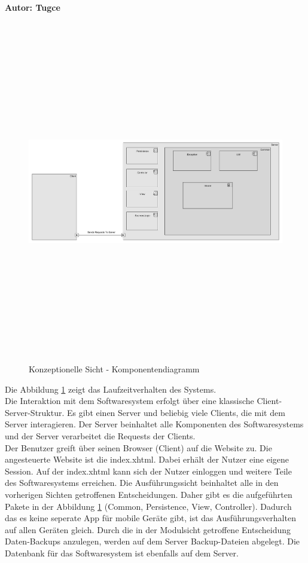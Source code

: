 \textbf{Autor: Tugce}\\
\begin{figure}[ht]
	\centering
  \includegraphics[width=\textwidth,height=15cm,keepaspectratio]{../UMLDiagramme/A-Sicht}
	\caption{Konzeptionelle Sicht - Komponentendiagramm}
	\label{fig15}
\end{figure}
Die Abbildung \ref{fig15} zeigt das Laufzeitverhalten des Systems.\\
Die Interaktion mit dem Softwaresystem erfolgt über eine klassische Client-Server-Struktur.  Es gibt einen Server und beliebig viele Clients, die mit dem Server interagieren. Der Server beinhaltet alle Komponenten des Softwaresystems und der Server verarbeitet die Requests der Clients.   \\
Der Benutzer greift über seinen Browser (Client) auf die Website zu. Die angesteuerte Website ist die index.xhtml. Dabei erhält der Nutzer eine eigene Session. Auf der index.xhtml kann sich der Nutzer einloggen und weitere Teile des Softwaresystems erreichen.
Die Ausführungssicht beinhaltet alle in den vorherigen Sichten getroffenen Entscheidungen. Daher gibt es die aufgeführten Pakete in der Abbildung \ref{fig15} (Common, Persistence, View, Controller). Dadurch das es keine seperate App für mobile Geräte gibt, ist das Ausführungsverhalten auf allen Geräten gleich. Durch die in der Modulsicht getroffene Entscheidung Daten-Backups anzulegen, werden auf dem Server Backup-Dateien abgelegt. Die Datenbank für das Softwaresystem ist ebenfalls auf dem Server. 